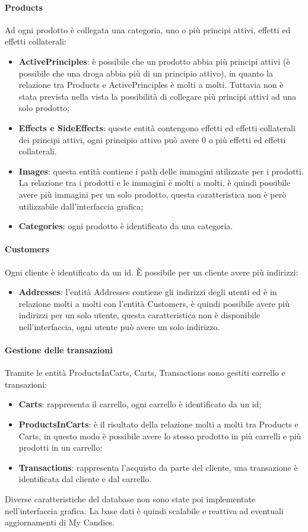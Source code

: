 \paragraph{Products} Ad ogni prodotto è collegata una categoria, uno o più principi attivi, effetti ed effetti collaterali:  \begin{itemize}
    \item[] \textbf{ActivePrinciples}: è possibile che un prodotto abbia più principi attivi (è possibile che una droga abbia più di un principio attivo), in quanto la relazione tra Products e ActivePrinciples è molti a molti. Tuttavia non è stata prevista nella vista la possibilità di collegare più principi attivi ad una solo prodotto;
     \item[] \textbf{Effects e SideEffects}: queste entità contengono effetti ed effetti collaterali dei principi attivi, ogni principio attivo può avere 0 o più effetti ed effetti collaterali.
     \item[] \textbf{Images}: questa entità contiene i path delle immagini utilizzate per i prodotti. La relazione tra i prodotti e le immagini è molti a molti, è quindi possibile avere più immagini per un solo prodotto, questa caratteristica non è però utilizzabile dall'interfaccia grafica;
     \item[] \textbf{Categories}: ogni prodotto è identificato da una categoria.
\end{itemize}
\paragraph{Customers} Ogni cliente è identificato da un id. È possibile per un cliente avere più indirizzi:
 \begin{itemize}
    \item[] \textbf{Addresses}: l'entità Addresses contiene gli indirizzi degli utenti ed è in relazione molti a molti con l'entità Customers, è quindi possibile avere più indirizzi per un solo utente, questa caratteristica non è disponibile nell'interfaccia, ogni utente può avere un solo indirizzo.
\end{itemize}
\paragraph{Gestione delle transazioni} Tramite le entità ProductsInCarts, Carts, Transactions sono gestiti carrello e transazioni:
\begin{itemize}
    \item[] \textbf{Carts}: rappresenta il carrello, ogni carrello è identificato da un id;
     \item[] \textbf{ProductsInCarts}: è il risultato della relazione molti a molti tra Products e Carts, in questo modo è possibile avere lo stesso prodotto in più carrelli e più prodotti in un carrello;
    \item[] \textbf{Transactions}: rappresenta l'acquisto da parte del cliente, una transazione è identificata dal cliente e dal carrello.
\end{itemize}
Diverse caratteristiche del database non sono state poi implementate nell'interfaccia grafica. La base dati è quindi scalabile e reattiva ad eventuali aggiornamenti di My Candies.

